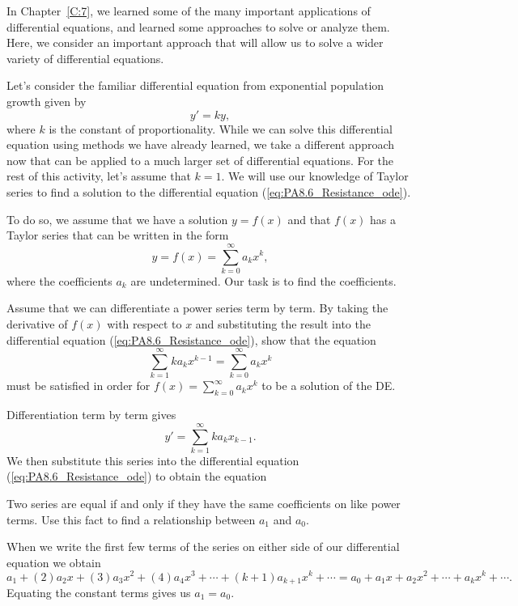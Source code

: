 \begin{pa} \label{PA:8.6}
In Chapter~\ref{C:7}, we learned some of the many important applications of differential equations, and learned some approaches to solve or analyze them.  Here, we consider an important approach that will allow us to solve a wider variety of differential equations.

Let's consider the familiar differential equation from exponential population growth given by
\begin{equation} \label{eq:PA8.6_Resistance_ode}
y' = ky,
\end{equation}
where $k$ is the constant of proportionality. While we can solve this differential equation using methods we have already learned, we take a different approach now that can be applied to a much larger set of differential equations. For the rest of this activity, let's assume that $k=1$. We will use our knowledge of Taylor series to find a solution to the differential equation (\ref{eq:PA8.6_Resistance_ode}). 

To do so, we assume that we have a solution $y=f(x)$ and that $f(x)$ has a Taylor series that can be written in the form
\[y = f(x) = \sum_{k=0}^{\infty} a_kx^k,\]
where the coefficients $a_k$ are undetermined. Our task is to find the coefficients.
\ba
    \item Assume that we can differentiate a power series term by term.  By taking the derivative of $f(x)$ with respect to $x$ and substituting the result into the differential equation (\ref{eq:PA8.6_Resistance_ode}), show that the equation
\[\sum_{k=1}^{\infty} ka_kx^{k-1} = \sum_{k=0}^{\infty} a_kx^{k}\]
must be satisfied in order for $f(x) = \sum_{k=0}^{\infty} a_kx^k$ to be a solution of the DE.
\begin{activitySolution}

Differentiation term by term gives
\[y' = \sum_{k=1}^{\infty} ka_kx_{k-1}.\]
We then substitute this series into the differential equation (\ref{eq:PA8.6_Resistance_ode}) to obtain the equation

\end{activitySolution}

\item Two series are equal if and only if they have the same coefficients on like power terms. Use this fact to find a relationship between $a_1$ and $a_0$.

\begin{activitySolution}

When we write the first few terms of the series on either side of our differential equation we obtain
\[a_1 + (2)a_2x + (3)a_3x^2 + (4)a_4x^3 + \cdots + (k+1)a_{k+1}x^{k} + \cdots = a_0 + a_1x + a_2x^2 + \cdots + a_kx^k + \cdots.\]
Equating the constant terms gives us $a_1 = a_0$.


\end{activitySolution}
\end{pa}
